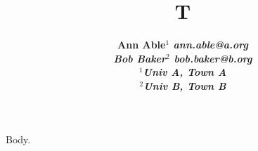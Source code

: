 \documentclass{article}
\newcommand{\name}{\bfseries}
\newcommand{\email}{\mdseries\slshape}
\newcommand{\addr}{\mdseries\upshape}
\begin{document}
\title{T}
\author{\name Ann Able$^1$ \email ann.able@a.org \\
\name Bob Baker$^2$ \email bob.baker@b.org \\
\addr $^1$Univ A, Town A\\
\addr $^2$Univ B, Town B}
\maketitle
Body.
\end{document}
